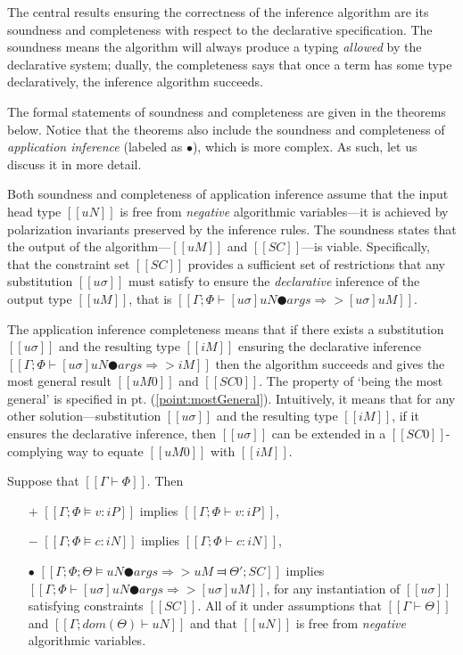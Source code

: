 \label{sec:proofs}
The central results ensuring the correctness of the inference algorithm are its
soundness and completeness with respect to the declarative specification. The
soundness means the algorithm will always produce a typing \emph{allowed} by the
declarative system; dually, the completeness says that once a term has some type
declaratively, the inference algorithm succeeds. 

The formal statements of soundness and completeness are given in the theorems
below. Notice that the theorems also include the soundness and completeness of
\emph{application inference} (labeled as $\bullet$), which is more complex. As
such, let us discuss it in more detail.

Both soundness and completeness of application inference assume that the input
head type $[[uN]]$ is free from \emph{negative} algorithmic variables---it is
achieved by polarization invariants preserved by the inference rules. The
soundness states that the output of the algorithm---$[[uM]]$ and $[[SC]]$---is
viable. Specifically, that the constraint set $[[SC]]$ provides a sufficient set
of restrictions that any substitution $[[uσ]]$ must satisfy to ensure the
\emph{declarative} inference of the output type $[[uM]]$, that is 
$[[ Γ ; Φ ⊢ [uσ]uN ● args ⇒> [uσ]uM ]]$.

The application inference completeness means that if there exists a substitution
$[[uσ]]$ and the resulting type $[[iM]]$ ensuring the declarative inference
$[[Γ; Φ ⊢ [uσ]uN ● args ⇒> iM]]$ then the algorithm succeeds and gives the most
general result $[[uM0]]$ and $[[SC0]]$. The property of `being the most general'
is specified in pt. (\ref{point:mostGeneral}). Intuitively, it means that for
any other solution---substitution $[[uσ]]$ and the resulting type $[[iM]]$, if
it ensures the declarative inference, then $[[uσ]]$ can be extended in a
$[[SC0]]$-complying way to equate $[[uM0]]$ with $[[iM]]$.


\begin{theorem*}
    \label{thm:soundness-typing}
    Suppose that $[[Γ ⊢ Φ]]$. Then\footnotemark[1]
    \begin{itemize}
        \item [$+$] $[[Γ; Φ ⊨ v : iP]]$ implies $[[Γ; Φ ⊢ v : iP]]$,
        \item [$-$] $[[Γ; Φ ⊨ c : iN]]$ implies $[[Γ; Φ ⊢ c : iN]]$,
        \item [$\bullet$] $[[Γ; Φ; Θ ⊨ uN ● args ⇒> uM ⫤ Θ'; SC]]$ implies $[[ Γ ; Φ ⊢ [uσ]uN ● args ⇒> [uσ]uM ]]$, 
            for any instantiation of $[[uσ]]$ satisfying constraints $[[SC]]$.
            All of it under assumptions that $[[Γ ⊢ Θ]]$ and $[[Γ; dom(Θ) ⊢ uN]]$ and that $[[uN]]$ is free from 
            \emph{negative} algorithmic variables.
    \end{itemize}
\end{theorem*}

